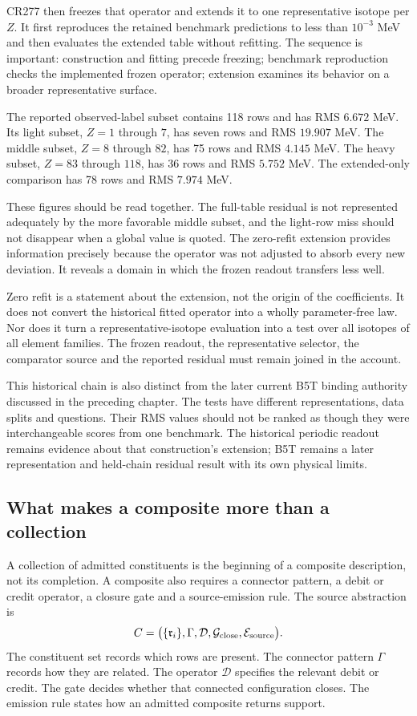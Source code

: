 CR277 then freezes that operator and extends it to one representative isotope per $Z$. It first reproduces the retained benchmark predictions to less than $10^{-3}$ MeV and then evaluates the extended table without refitting. The sequence is important: construction and fitting precede freezing; benchmark reproduction checks the implemented frozen operator; extension examines its behavior on a broader representative surface.

The reported observed-label subset contains 118 rows and has RMS $6.672$ MeV. Its light subset, $Z=1$ through $7$, has seven rows and RMS $19.907$ MeV. The middle subset, $Z=8$ through $82$, has 75 rows and RMS $4.145$ MeV. The heavy subset, $Z=83$ through $118$, has 36 rows and RMS $5.752$ MeV. The extended-only comparison has 78 rows and RMS $7.974$ MeV.

These figures should be read together. The full-table residual is not represented adequately by the more favorable middle subset, and the light-row miss should not disappear when a global value is quoted. The zero-refit extension provides information precisely because the operator was not adjusted to absorb every new deviation. It reveals a domain in which the frozen readout transfers less well.

Zero refit is a statement about the extension, not the origin of the coefficients. It does not convert the historical fitted operator into a wholly parameter-free law. Nor does it turn a representative-isotope evaluation into a test over all isotopes of all element families. The frozen readout, the representative selector, the comparator source and the reported residual must remain joined in the account.

This historical chain is also distinct from the later current B5T binding authority discussed in the preceding chapter. The tests have different representations, data splits and questions. Their RMS values should not be ranked as though they were interchangeable scores from one benchmark. The historical periodic readout remains evidence about that construction's extension; B5T remains a later representation and held-chain residual result with its own physical limits.

\subsection{What makes a composite more than a collection}

A collection of admitted constituents is the beginning of a composite description, not its completion. A composite also requires a connector pattern, a debit or credit operator, a closure gate and a source-emission rule. The source abstraction is
\begin{equation}
C=\bigl(\{\mathfrak r_i\},\Gamma,\mathcal D,
\mathcal G_{\rm close},\mathcal E_{\rm source}\bigr).
\end{equation}
The constituent set records which rows are present. The connector pattern $\Gamma$ records how they are related. The operator $\mathcal D$ specifies the relevant debit or credit. The gate decides whether that connected configuration closes. The emission rule states how an admitted composite returns support.

